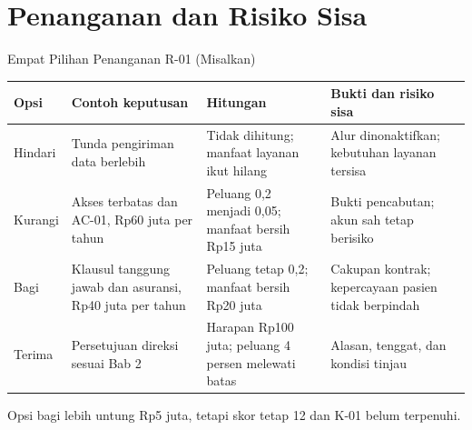 \documentclass[aspectratio=169, table, 12pt]{beamer}
\begin{document}
\section{Penanganan dan Risiko Sisa}

\begin{frame}{{\Large Empat Pilihan Penanganan R-01 (Misalkan)}}
  \vspace{2pt}
  \scriptsize
  \begin{tabularx}{\textwidth}{|>{\raggedright\arraybackslash}p{}|>{\raggedright\arraybackslash}X|>{\raggedright\arraybackslash}X|>{\raggedright\arraybackslash}X|}
    \hline
    \textbf{Opsi} & \textbf{Contoh keputusan} & \textbf{Hitungan} & \textbf{Bukti dan risiko sisa} \\
    \hline
    Hindari & Tunda pengiriman data berlebih & Tidak dihitung; manfaat layanan ikut hilang & Alur
    dinonaktifkan; kebutuhan layanan tersisa \\ \hline
    Kurangi & Akses terbatas dan AC-01, Rp60 juta per tahun & Peluang 0,2 menjadi 0,05; manfaat bersih
    Rp15 juta & Bukti pencabutan; akun sah tetap berisiko \\ \hline
    Bagi & Klausul tanggung jawab dan asuransi, Rp40 juta per tahun & Peluang tetap 0,2; manfaat bersih
    Rp20 juta & Cakupan kontrak; kepercayaan pasien tidak berpindah \\ \hline
    Terima & Persetujuan direksi sesuai Bab 2 & Harapan Rp100 juta; peluang 4 persen melewati batas &
    Alasan, tenggat, dan kondisi tinjau \\ \hline
  \end{tabularx}

  \vspace{6pt}
  \small Opsi bagi lebih untung Rp5 juta, tetapi skor tetap 12 dan K-01 belum terpenuhi.
\end{frame}
\end{document}
